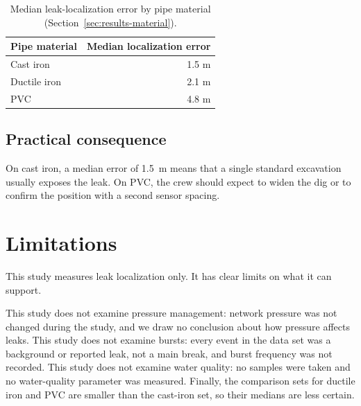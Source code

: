 \documentclass{article}
\begin{document}
\begin{table}[h]
  \centering
  \caption{Median leak-localization error by pipe material
    (Section~\ref{sec:results-material}).}
  \label{tab:material}
  \begin{tabular}{lr}
    \hline
    Pipe material & Median localization error \\
    \hline
    Cast iron     & 1.5 m \\
    Ductile iron  & 2.1 m \\
    PVC           & 4.8 m \\
    \hline
  \end{tabular}
\end{table}

\subsection{Practical consequence}
\label{sec:results-practice}

On cast iron, a median error of 1.5~m means that a single standard excavation
usually exposes the leak. On PVC, the crew should expect to widen the dig or to
confirm the position with a second sensor spacing.

\section{Limitations}
\label{sec:limitations}

This study measures leak localization only. It has clear limits on what it
can support.

This study does not examine pressure management: network pressure was not
changed during the study, and we draw no conclusion about how pressure affects
leaks. This study does not examine bursts: every event in the data set was a
background or reported leak, not a main break, and burst frequency was not
recorded. This study does not examine water quality: no samples were taken and
no water-quality parameter was measured. Finally, the comparison sets for
ductile iron and PVC are smaller than the cast-iron set, so their medians are
less certain.
\end{document}
